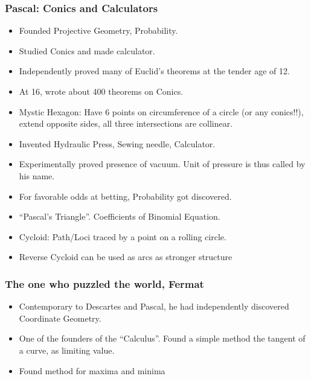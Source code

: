 \begin{frame}[fragile]
\frametitle{Pascal: Conics and Calculators}
\begin{itemize}
\item Founded Projective Geometry, Probability.
\item Studied Conics and made calculator.
\item Independently proved many of Euclid's theorems at the tender age of 12.
\item At 16, wrote about 400 theorems on Conics.
\item Mystic Hexagon: Have 6 points on circumference of  a circle (or any conics!!), extend opposite sides, all three intersections are collinear.
\item Invented Hydraulic Press, Sewing needle, Calculator.
\item Experimentally proved presence of vacuum. Unit of pressure is  thus called by his name.
\item For favorable odds at betting, Probability  got discovered.
\item ``Pascal's Triangle''. Coefficients of Binomial Equation.
\item Cycloid: Path/Loci traced by a point on a rolling circle.
\item Reverse Cycloid can be used as arcs as stronger structure
\end{itemize}
\end{frame}

\begin{frame}[fragile]
\frametitle{The one who puzzled the world, Fermat}
\begin{itemize}
\item Contemporary to Descartes and Pascal, he had independently discovered Coordinate Geometry.
\item One of the founders of the ``Calculus''. Found a simple method the tangent of a curve, as limiting value.
\item Found method for maxima and minima 
\end{itemize}
\end{frame}

